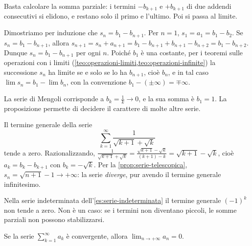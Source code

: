 \begin{schema}
\end{schema}

\begin{strategia}
Basta calcolare la somma parziale: i termini $-b_{k+1}$ e $+b_{k+1}$ di due addendi
consecutivi si elidono, e restano solo il primo e l'ultimo. Poi si passa al limite.
\end{strategia}

\begin{dimostrazione}
Dimostriamo per induzione che $s_{n}=b_{1}-b_{n+1}$. Per $n=1$, $s_{1}=a_{1}=b_{1}-b_{2}$. Se
$s_{n}=b_{1}-b_{n+1}$, allora $s_{n+1}=s_{n}+a_{n+1}=b_{1}-b_{n+1}+b_{n+1}-b_{n+2}=b_{1}-b_{n+2}$. Dunque
$s_{n}=b_{1}-b_{n+1}$ per ogni $n$. Poiché $b_{1}$ è una costante, per i teoremi sulle
operazioni con i limiti (\cref{teo:operazioni-limiti,teo:operazioni-infinite}) la
successione $s_{n}$ ha limite se e solo se lo ha $b_{n+1}$, cioè $b_{n}$, e in tal caso
$\lim s_{n}=b_{1}-\lim b_{n}$, con la convenzione $b_{1}-(\pm\infty)=\mp\infty$.
\end{dimostrazione}

La serie di Mengoli corrisponde a $b_{k}=\frac1k\to0$, e la sua somma è $b_{1}=1$. La
proposizione permette di decidere il carattere di molte altre serie.

\begin{esempio}\label{es:serie-radici}
Il termine generale della serie
\begin{equation}\label{eq:serie-radici}
  \sum_{k=1}^{\infty}\frac1{\sqrt{k+1}+\sqrt k}
\end{equation}
tende a zero. Razionalizzando,
$\frac1{\sqrt{k+1}+\sqrt k}=\frac{\sqrt{k+1}-\sqrt k}{(k+1)-k}=\sqrt{k+1}-\sqrt k$, cioè $a_{k}=b_{k}-b_{k+1}$ con
$b_{k}=-\sqrt k$. Per la \cref{prop:serie-telescopica}, $s_{n}=\sqrt{n+1}-1\to+\infty$: la serie
\emph{diverge}, pur avendo il termine generale infinitesimo.
\end{esempio}

Nella serie indeterminata dell'\cref{es:serie-indeterminata} il termine generale $(-1)^{k}$
non tende a zero. Non è un caso: se i termini non diventano piccoli, le somme parziali
non possono stabilizzarsi.

\begin{teorema}\label{teo:condizione-necessaria}
Se la serie $\sum_{k=1}^{\infty}a_{k}$ è convergente, allora $\lim_{n\to+\infty}a_{n}=0$.
\end{teorema}

